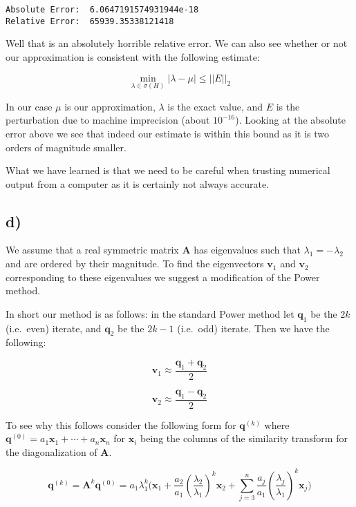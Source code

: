 \documentclass[11pt]{article}
\begin{document}
    \begin{Verbatim}[commandchars=\\\{\}]
Absolute Error:  6.0647191574931944e-18
Relative Error:  65939.35338121418
    \end{Verbatim}

    Well that is an absolutely horrible relative error. We can also see
whether or not our approximation is consistent with the following
estimate:

\[ \min_{\lambda\in\sigma(H)}|\lambda-\mu|\leq||E||_2 \]

    In our case \(\mu\) is our approximation, \(\lambda\) is the exact
value, and \(E\) is the perturbation due to machine imprecision (about
\(10^{-16}\)). Looking at the absolute error above we see that indeed
our estimate is within this bound as it is two orders of magnitude
smaller.

What we have learned is that we need to be careful when trusting
numerical output from a computer as it is certainly not always accurate.

    \hypertarget{d}{%
\subsection*{d)}\label{d}}

We assume that a real symmetric matrix \(\mathbf{A}\) has eigenvalues
such that \(\lambda_1=-\lambda_2\) and are ordered by their magnitude.
To find the eigenvectors \(\mathbf{v}_1\) and \(\mathbf{v}_2\)
corresponding to these eigenvalues we suggest a modification of the
Power method.

    In short our method is as follows: in the standard Power method let
\(\mathbf{q}_1\) be the \(2k\) (i.e.~even) iterate, and \(\mathbf{q}_2\)
be the \(2k-1\) (i.e.~odd) iterate. Then we have the following:

\[\mathbf{v}_1\approx\frac{\mathbf{q}_1+\mathbf{q}_2}{2}\]

\[\mathbf{v}_2\approx\frac{\mathbf{q}_1-\mathbf{q}_2}{2}\]

    To see why this follows consider the following form for
\(\mathbf{q}^{(k)}\) where
\(\mathbf{q}^{(0)} = a_1\mathbf{x}_1 + \cdots + a_n\mathbf{x}_n\) for
\(\mathbf{x}_i\) being the columns of the similarity transform for the
diagonalization of \(\mathbf{A}\).

    \[ \mathbf{q}^{(k)} = \mathbf{A}^k\mathbf{q}^{(0)} = a_1\lambda_1^k\big(\mathbf{x}_1+\frac{a_2}{a_1}(\frac{\lambda_2}{\lambda_1})^k\mathbf{x}_2+\sum_{j=3}^n\frac{a_j}{a_1}(\frac{\lambda_j}{\lambda_1})^k\mathbf{x}_j\big) \]
\end{document}
